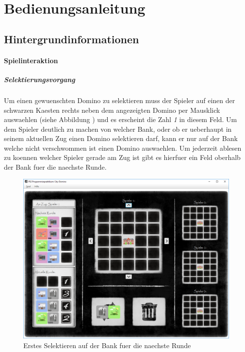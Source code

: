 
\section{Bedienungsanleitung}
\subsection{Hintergrundinformationen}

\paragraph{Spielinteraktion}
\subparagraph{Selektierungsvorgang}
Um einen gewuenschten Domino zu selektieren muss der Spieler auf einen der schwarzen Kaesten rechts neben dem angezeigten Domino per Mausklick auswaehlen (siehe Abbildung \pageref{fig:erstesSelektierenNaechsteBank}) und es erscheint die Zahl \emph{1} in diesem Feld. Um dem Spieler deutlich zu machen von welcher Bank, oder ob er ueberhaupt in seinem aktuellen Zug einen Domino selektieren darf, kann er nur auf der Bank welche nicht verschwommen ist einen Domino auswaehlen. Um jederzeit ablesen zu koennen welcher Spieler gerade am Zug ist gibt es hierfuer ein Feld oberhalb der Bank fuer die naechste Runde. 

\begin{figure}
	\centering
	\includegraphics{screenshots/screenshot_ErstesSelektierenAufNaechsterBank}
	\caption[Erstes Selektieren]{Erstes Selektieren auf der Bank fuer die naechste Runde}
	\label{fig:erstesSelektierenNaechsteBank}
\end{figure}

